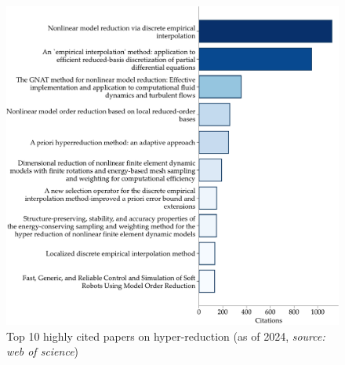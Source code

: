 \documentclass[11pt]{article}
\begin{document}
\begin{figure}[t]
	    \centering
	    \includegraphics[width=0.8\linewidth]{papers.pdf}
	    \caption{Top 10 highly cited papers on hyper-reduction (as of 2024, \textit{source: web of science}) \cite{chaturantabut2010nonlinear,barrault2004empirical,carlberg2013gnat,amsallem2012nonlinear,ryckelynck2005priori,farhat2014dimensional,drmac2016new,farhat2015structure-preserving,peherstorfer2014localized,goury2018fast}}
\label{fig:citations}
\end{figure}
\end{document}
